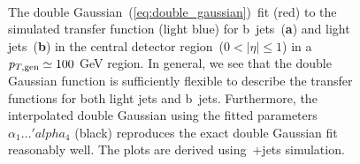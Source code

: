 \begin{figure}
\begin{centering}
 \\
\caption[The double-Gaussian transfer function fit in~\ttbar~simulation.]{The double Gaussian~(\cref{eq:double_gaussian})~fit (red) to the simulated transfer function (light blue) for b~jets~(\textbf{a}) and light jets~(\textbf{b}) in the central detector region~($0 < |\eta| \le 1$) in a~$p_{T,\mathrm{gen}} \simeq 100$ GeV region. In general, we see that the double Gaussian function is sufficiently flexible to describe the transfer functions for both light jets and b~jets. Furthermore, the interpolated double Gaussian using the fitted parameters~$\alpha_1 \dots 'alpha_4$ (black) reproduces the exact double Gaussian fit reasonably well. The plots are derived using~\ttbar+jets simulation.}
\label{fig:transfer_perbin}
\end{centering}
\end{figure}

